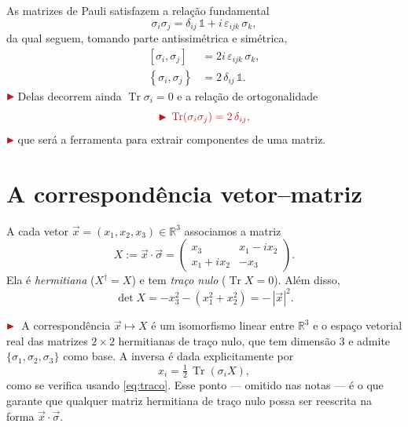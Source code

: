 \documentclass[12pt,a4paper]{article}
\newcommand{\marcador}{\ensuremath{\color{corDestaque}\blacktriangleright}\,}
\newcommand{\add}[1]{{\marcador\color{corDestaque}#1}}
\newenvironment{nota}{\par\color{corDestaque}\noindent\marcador\ignorespaces}{\par}
\newcommand{\R}{\mathbb{R}}
\newcommand{\id}{\mathbb{1}}                 %
\newcommand{\dg}{\dagger}
\newcommand{\Tr}{\operatorname{Tr}}
\newcommand{\vsig}{\vec{\sigma}}
\newcommand{\vx}{\vec{x}}
\newcommand{\comm}[2]{\left[#1,#2\right]}
\newcommand{\acomm}[2]{\left\{#1,#2\right\}}
\theoremstyle{definition}
\theoremstyle{plain}
\theoremstyle{remark}
\begin{document}
As matrizes de Pauli satisfazem a relação fundamental
\begin{equation}\label{eq:pauliprod}
  \sigma_i\sigma_j=\delta_{ij}\,\id+i\,\varepsilon_{ijk}\,\sigma_k,
\end{equation}
da qual seguem, tomando parte antissimétrica e simétrica,
\begin{align}
  \comm{\sigma_i}{\sigma_j}&=2i\,\varepsilon_{ijk}\,\sigma_k,\label{eq:commpauli}\\
  \acomm{\sigma_i}{\sigma_j}&=2\,\delta_{ij}\,\id.\label{eq:acommpauli}
\end{align}
\add{Delas decorrem ainda $\Tr\sigma_i=0$ e a relação de ortogonalidade}
\begin{equation}\label{eq:traco}
  \add{\Tr(\sigma_i\sigma_j)=2\,\delta_{ij},}
\end{equation}
\add{que será a ferramenta para extrair componentes de uma matriz.}

\section{A correspondência vetor--matriz}

A cada vetor $\vx=(x_1,x_2,x_3)\in\R^3$ associamos a matriz
\begin{equation}\label{eq:X}
  X:=\vx\cdot\vsig=
  \begin{pmatrix} x_3 & x_1-ix_2\\ x_1+ix_2 & -x_3\end{pmatrix}.
\end{equation}
Ela é \emph{hermitiana} ($X^{\dg}=X$) e tem \emph{traço nulo}
($\Tr X=0$). Além disso,
\begin{equation}\label{eq:detX}
  \det X=-x_3^2-(x_1^2+x_2^2)=-\,|\vx|^2 .
\end{equation}

\begin{nota}
A correspondência $\vx\mapsto X$ é um isomorfismo linear entre $\R^3$ e o
espaço vetorial real das matrizes $2\times2$ hermitianas de traço nulo, que
tem dimensão $3$ e admite $\{\sigma_1,\sigma_2,\sigma_3\}$ como base. A
inversa é dada explicitamente por
\[
  x_i=\tfrac12\,\Tr(\sigma_i X),
\]
como se verifica usando \eqref{eq:traco}. Esse ponto — omitido nas notas —
é o que garante que qualquer matriz hermitiana de traço nulo possa ser
reescrita na forma $\vx\cdot\vsig$.
\end{nota}
\end{document}
